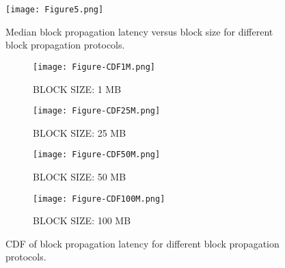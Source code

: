 \documentclass[10pt,journal,compsoc]{IEEEtran}
\begin{document}
\begin{figure}[!t]
	\centering
	\texttt{[image: Figure5.png]}
	\caption{Median block propagation latency versus block size for different block propagation protocols.}
	\label{fig_5}
\end{figure}

\begin{figure}
	\begin{subfigure}{.5\textwidth}
		\centering
		\texttt{[image: Figure-CDF1M.png]}  
		\caption{BLOCK SIZE: 1 MB}
		
	\end{subfigure}
	\begin{subfigure}{.5\textwidth}
		\centering
		\texttt{[image: Figure-CDF25M.png]} \caption{BLOCK SIZE: 25 MB}
	\end{subfigure}
	
	\begin{subfigure}{.5\textwidth}
		\centering
		\texttt{[image: Figure-CDF50M.png]} \caption{BLOCK SIZE: 50 MB}
		
	\end{subfigure}

	\begin{subfigure}{.5\textwidth}
		\centering
		\texttt{[image: Figure-CDF100M.png]}\caption{BLOCK SIZE: 100 MB}
	\end{subfigure}
	\caption{CDF of block propagation latency for different block propagation protocols.}
	\label{fig_6}
\end{figure}
\end{document}
